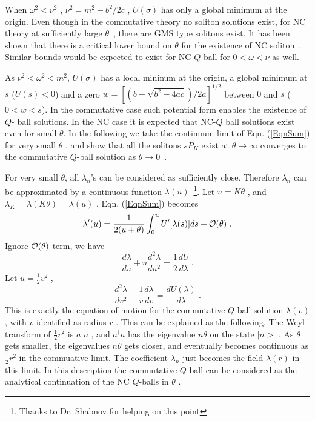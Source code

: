 \documentclass[a4paper,a4paper]{article}
\begin{document}
When $\omega^2<\nu^2$ , $\nu^2=m^2-{b^2}/{2c}$ , $U(\sigma)$
has only a global minimum at the origin. Even though in the
commutative theory no soliton solutions exist, for NC theory at
sufficiently large $\theta$\ , there are GMS type solitons exist. It has
been shown that there is a critical lower bound on $\theta$ for the
existence of NC soliton~\cite{Zhou}. Similar bounds would be expected
to exist for NC $Q$-ball for $0<\omega<\nu$ as well.

As $\nu^2<\omega^2<m^2$, $U(\sigma)$ has a local mininum at
the origin, a global minimum at $s$ ($U(s)<0$) and a zero 
$w=[(b-\sqrt{b^2-4ac})/2a]^{1/2}$ between $0$ and $s$ ($0<w<s$). In
the commutative case such potential form enables the existence of $Q$-
ball solutions. In the NC case it is expected that NC-$Q$ ball
solutions exist even for small $\theta$. In the following we take the
continuum limit of Eqn. (\ref{EqnSum}) for very small $\theta$ ,
and show that all the solitons $sP_K$ exist at $\theta\rightarrow
\infty$ converges to the commutative $Q$-ball solution as
$\theta\rightarrow 0$\ .

For very small $\theta$, all $\lambda_n$'s can be considered as
sufficiently close. Therefore $\lambda_n$ can be approximated by a
continuous function $\lambda(u)$~\footnote{Thanks to Dr. Shabnov for
helping on this point}. Let $u=K\theta$ , and
$\lambda_K=\lambda(K\theta)=\lambda(u)$ . Eqn. (\ref{EqnSum}) becomes
\begin{equation}
\lambda'(u)=\frac 1{2(u+\theta)}\int_0^{u}U'[\lambda(s)]ds+{\cal
O}(\theta)\ .
\end{equation}
Ignore ${\cal O}(\theta)$ term, we have
\begin{equation}
\frac{d\lambda}{du}+u\frac{d^2\lambda}{du^2}=\frac
12\frac{dU}{d\lambda}\ .
\end{equation}
Let $u=\frac 12v^2$ ,
\begin{equation}
  \frac{d^2\lambda}{dv^2}+\frac 1v\frac{d\lambda}{dv}=\frac
  {dU(\lambda)}{d\lambda}\ .
\end{equation}
This is exactly the equation of motion for the commutative $Q$-ball 
solution $\lambda(v)$ , 
with $v$ identified as radius $r$ . This can be explained as the following. The
Weyl transform of $\frac 12r^2$ is $a^\dag
a$ , and $a^\dag a$ has the eigenvalue $n\theta$ on the state $|n>$ .
As $\theta$ gets smaller, the eigenvalues $n\theta$ gets closer, and eventually
becomes continuous as $\frac 12r^2$ in the commuative limit. The coefficient
$\lambda_n$ just becomes the field $\lambda(r)$ in this limit.
In this description 
the commutative $Q$-ball can be considered as the analytical continuation of 
the NC $Q$-balls in $\theta$ .  
\end{document}
